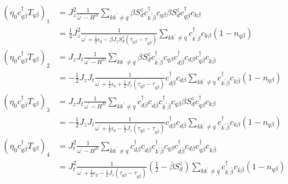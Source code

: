 \documentclass[14pt]{extarticle}
\numberwithin{equation}{section}
\begin{document}
\begin{subequations} \label{eq:26} 
 \begin{align}
\left( \eta_0 c^{\dag}_{q\beta}T_{q \beta} \right)_1  &= J_z^2\frac{1}{\omega^{\prime} - H^D}\sum\limits_{kk^{\prime}\ne q} \beta S_d^z c^{\dag}_{k^{\prime}\beta}c_{q\beta}  \beta S_d^z c^{\dag}_{q\beta}c_{k\beta} \nonumber\\
                                        &= \frac{1}{4} J_z^2 \frac{1}{\omega^{\prime} + \frac{1}{2} \epsilon_q -\beta J_zS^z_d \left( \tau_{q\beta} - \tau_{q\bar{\beta}} \right)}  \sum\limits_{kk^{\prime}\ne q} c^{\dag}_{k^{\prime}\beta} c_{k\beta} \left( 1 - n_{q\beta} \right)   \label{eq:27}  \\
     \left( \eta_0 c^{\dag}_{q\beta}T_{q \beta} \right)_2  &= J_z J_t  \frac{1}{\omega^{\prime} - H^D}  \sum\limits_{kk^{\prime}\ne q} \beta S_d^z c^{\dag}_{k^{\prime}\beta}c_{q\beta} c^{\dag}_{d\bar{\beta}} c_{d\beta} c^{\dag}_{q\beta}c_{k\bar{\beta}} \nonumber\\
                                        &= - \frac{1}{2} J_z J_t  \frac{1}{\omega^{\prime} + \frac{1}{2}\epsilon_q + \frac{1}{2} J_z \left( \tau_{q\beta} - \tau_{q\bar{\beta}} \right)} c^{\dag}_{d\bar{\beta}} c_{d\beta} \sum\limits_{kk^{\prime}\ne q}  c^{\dag}_{k^{\prime}\beta}c_{k\bar{\beta}} \left( 1 - n_{q\beta} \right) \label{eq:28} \\
     \left( \eta_0 c^{\dag}_{q\beta}T_{q \beta} \right)_3  &= J_z J_t \frac{1}{\omega^{\prime} - H^D} \sum\limits_{kk^{\prime}\ne q} c^{\dag}_{d\beta} c_{d\bar{\beta}} c^{\dag}_{k^{\prime}\bar{\beta}}c_{q\beta}   \beta S_d^z c^{\dag}_{q\beta}c_{k\beta} \nonumber\\
                                        &= - \frac{1}{2} J_z J_t  \frac{1}{\omega^{\prime} + \frac{1}{2}\epsilon_q - \frac{1}{2} J_z \left( \tau_{q\beta} - \tau_{q\bar{\beta}} \right)} c^{\dag}_{d\beta} c_{d\bar{\beta}} \sum\limits_{kk^{\prime}\ne q}  c^{\dag}_{k^{\prime}\bar{\beta}}c_{k\beta} \left( 1 - n_{q\beta} \right) \label{eq:29} \\
     \left( \eta_0 c^{\dag}_{q\beta}T_{q \beta} \right)_4  &= J_t^2 \frac{1}{\omega^{\prime} - H^D} \sum\limits_{kk^{\prime}\ne q}  c^{\dag}_{d\beta} c_{d\bar{\beta}}  c^{\dag}_{k^{\prime}\bar{\beta}}c_{q\beta}  c^{\dag}_{d\bar{\beta}} c_{d\beta} c^{\dag}_{q\beta}c_{k\bar{\beta}} \nonumber\\
                                        &= J_t^2 \frac{1}{\omega^{\prime} + \frac{1}{2}\epsilon_q - \frac{1}{2} J_z \left( \tau_{q\beta} - \tau_{q\bar{\beta}} \right)} \left( \frac{1}{2} - \bar{\beta} S_d^z \right) \sum\limits_{kk^{\prime}\ne q} c^{\dag}_{k^{\prime}\bar{\beta}} c_{k\bar{\beta}} \left( 1 - n_{q\beta} \right) \label{eq:30} 
\end{align}
\end{subequations}
\end{document}
